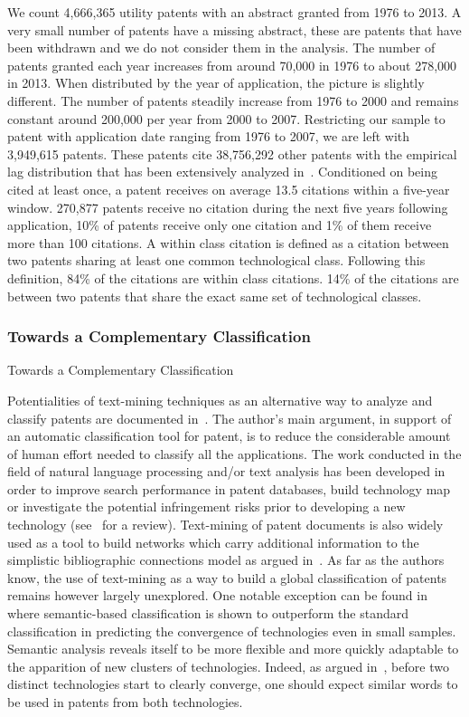 We count 4,666,365 utility patents with an abstract granted from 1976 to 2013. A very small number of patents have a missing abstract, these are patents that have been withdrawn and we do not consider them in the analysis. The number of patents granted each year increases from around 70,000 in 1976 to about 278,000 in 2013. When distributed by the year of application, the picture is slightly different. The number of patents steadily increase from 1976 to 2000 and remains constant around 200,000 per year from 2000 to 2007. Restricting our sample to patent with application date ranging from 1976 to 2007, we are left with 3,949,615 patents. These patents cite 38,756,292 other patents with the empirical lag distribution that has been extensively analyzed in~\cite{Hall2001}. Conditioned on being cited at least once, a patent receives on average 13.5 citations within a five-year window. 270,877 patents receive no citation during the next five years following application, 10\% of patents receive only one citation and 1\% of them receive more than 100 citations. A within class citation is defined as a citation between two patents sharing at least one common technological class. Following this definition, 84\% of the citations are within class citations. 14\% of the citations are between two patents that share the exact same set of technological classes.


\subsubsection*{Towards a Complementary Classification}{Towards a Complementary Classification}

Potentialities of text-mining techniques as an alternative way to analyze and classify patents are documented in~\cite{tseng2007text}. The author's main argument, in support of an automatic classification tool for patent, is to reduce the considerable amount of human effort needed to classify all the applications. The work conducted in the field of natural language processing and/or text analysis has been developed in order to improve search performance in patent databases, build technology map or investigate the potential infringement risks prior to developing a new technology (see~\cite{abbas2014literature} for a review). Text-mining of patent documents is also widely used as a tool to build networks which carry additional information to the simplistic bibliographic connections model as argued in~\cite{yoon2004text}. As far as the authors know, the use of text-mining as a way to build a global classification of patents remains however largely unexplored. One notable exception can be found in~\cite{preschitschek2013} where semantic-based classification is shown to outperform the standard classification in predicting the convergence of technologies even in small samples. Semantic analysis reveals itself to be more flexible and more quickly adaptable to the apparition of new clusters of technologies. Indeed, as argued in~\cite{preschitschek2013}, before two distinct technologies start to clearly converge, one should expect similar words to be used in patents from both technologies.

